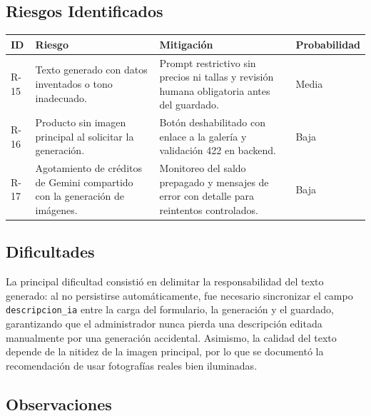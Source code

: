 \documentclass[12pt,a4paper]{article}
\begin{document}
\subsection*{Riesgos Identificados}

\begin{center}
\small
\begin{tabularx}{\textwidth}{p{1.2cm} p{4.6cm} L p{2cm}}
\toprule
\textbf{ID} & \textbf{Riesgo} & \textbf{Mitigación} & \textbf{Probabilidad} \\
\midrule
R-15 & Texto generado con datos inventados o tono inadecuado. & Prompt restrictivo sin precios ni tallas y revisión humana obligatoria antes del guardado. & Media \\
R-16 & Producto sin imagen principal al solicitar la generación. & Botón deshabilitado con enlace a la galería y validación 422 en backend. & Baja \\
R-17 & Agotamiento de créditos de Gemini compartido con la generación de imágenes. & Monitoreo del saldo prepagado y mensajes de error con detalle para reintentos controlados. & Baja \\
\bottomrule
\end{tabularx}
\end{center}

\subsection*{Dificultades}

La principal dificultad consistió en delimitar la responsabilidad del texto generado: al no persistirse automáticamente, fue necesario sincronizar el campo \texttt{descripcion\_ia} entre la carga del formulario, la generación y el guardado, garantizando que el administrador nunca pierda una descripción editada manualmente por una generación accidental. Asimismo, la calidad del texto depende de la nitidez de la imagen principal, por lo que se documentó la recomendación de usar fotografías reales bien iluminadas.

\subsection*{Observaciones}
\end{document}
